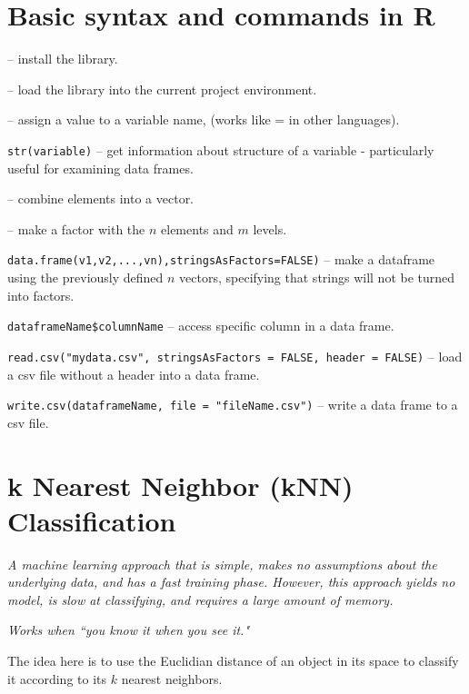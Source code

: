\documentclass[]{article}
\begin{document}
\section{Basic syntax and commands in R}
\begin{description}
	\item {} -- install the library.
	\item {} -- load the library into the current project environment. 
	\item \code{<-} -- assign a value to a variable name, (works like = in other languages).
	\item \verb|str(variable)| -- get information about structure of a variable - particularly useful for examining data frames.
	\item {} -- combine elements into a vector.
	\item {} -- make a factor with the $n$ elements and $m$ levels. 
	\item \verb|data.frame(v1,v2,...,vn),stringsAsFactors=FALSE)| -- make a dataframe using the previously defined $n$ vectors, specifying that strings will not be turned into factors.
	\item \verb|dataframeName$columnName| -- access specific column in a data frame.
	\item \verb|read.csv("mydata.csv", stringsAsFactors = FALSE, header = FALSE)| -- load a csv file without a header into a data frame. 
	\item \verb|write.csv(dataframeName, file = "fileName.csv")| -- write a data frame to a csv file.
\end{description}

\section{k Nearest Neighbor (kNN) Classification}
\emph{A machine learning approach that is simple, makes no assumptions about the underlying data, and has a fast training phase.  However, this approach yields no model, is slow at classifying, and requires a large amount of memory.}

\emph{Works when ``you know it when you see it."}

\vspace{0.2cm}


The idea here is to use the Euclidian distance of an object in its space to classify it according to its $k$ nearest neighbors.
\end{document}
